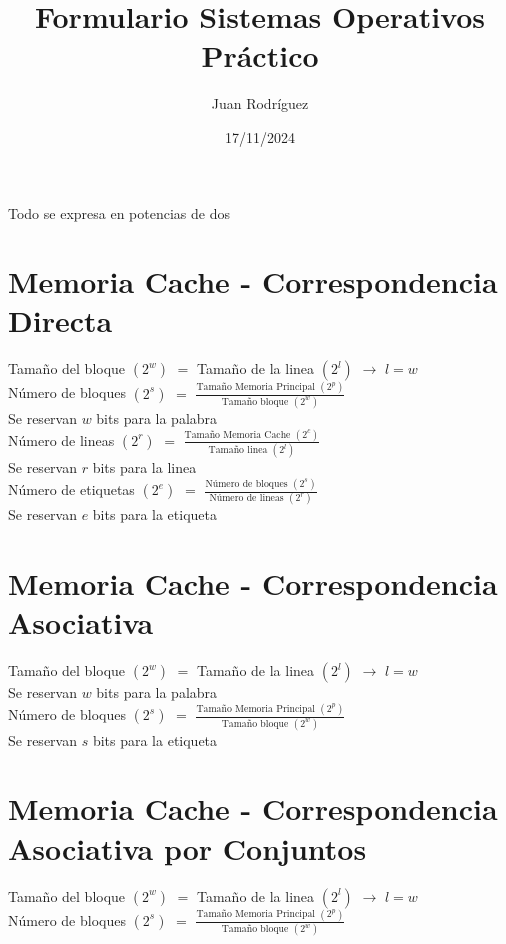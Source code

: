 \documentclass[fleqn]{article}
\author{Juan Rodríguez}
\title{Formulario Sistemas Operativos Práctico}
\date{17/11/2024}
\begin{document}
	\maketitle
	Todo se expresa en potencias de dos
	\section{Memoria Cache - Correspondencia Directa}
	Tamaño del bloque $(2^w)$ $=$ Tamaño de la linea $(2^l)$ $\rightarrow$ $l = w$ \\
	
	Número de bloques $(2^s)$ $=$ $\frac{\text{Tamaño Memoria Principal $(2^p)$}}{\text{Tamaño bloque $(2^w)$}}$ \\
	
	Se reservan $w$ bits para la palabra \\
	
	Número de lineas $(2^r)$ $=$ $\frac{\text{Tamaño Memoria Cache $(2^c)$}}{\text{Tamaño linea $(2^l)$}}$ \\
	
	Se reservan $r$ bits para la linea \\
	
	Número de etiquetas $(2^{e})$ $=$ $\frac{\text{Número de bloques $(2^s)$}}{\text{Número de lineas $(2^r)$}}$ \\
	
	Se reservan $e$ bits para la etiqueta
	\section{Memoria Cache - Correspondencia Asociativa}
	Tamaño del bloque $(2^w)$ $=$ Tamaño de la linea $(2^l)$ $\rightarrow$ $l = w$ \\
	
	Se reservan $w$ bits para la palabra \\
	
	Número de bloques $(2^s)$ $=$ $\frac{\text{Tamaño Memoria Principal $(2^p)$}}{\text{Tamaño bloque $(2^w)$}}$ \\
	
	Se reservan $s$ bits para la etiqueta
	\section{Memoria Cache - Correspondencia Asociativa por Conjuntos}
	Tamaño del bloque $(2^w)$ $=$ Tamaño de la linea $(2^l)$ $\rightarrow$ $l = w$ \\
	
	Número de bloques $(2^s)$ $=$ $\frac{\text{Tamaño Memoria Principal $(2^p)$}}{\text{Tamaño bloque $(2^w)$}}$ \\
	
\end{document}
